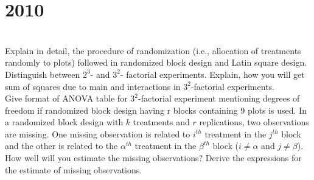 \section*{2010}
\vspace{-.5cm}
\hrulefill \smallskip\\
 Explain in detail, the procedure of randomization (i.e., allocation of treatments randomly to plots) followed in randomized block design and Latin square design.
\myline
{} Distinguish between $2^3$- and $3^2$- factorial experiments. Explain, how you will get sum of squares due to main and interactions in $3^2$-factorial experiments.\\
Give format of ANOVA table for $3^2$-factorial experiment mentioning degrees of freedom if randomized block design having r blocks containing 9 plots is used. 
\myline
{} In a randomized block design with $k$ treatments and $r$ replications, two observations are missing. One missing observation is related to $i^{th}$ treatment in the $j^{th}$ block and the other is related to the $\alpha^{th}$ treatment in the $\beta^{th}$ block ($i\neq \alpha$ and $j\neq\beta$). How well will you estimate the missing observations? Derive the expressions for the estimate of missing observations.